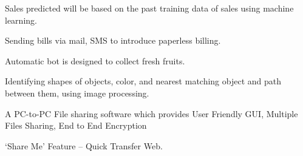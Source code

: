 \documentclass[]{hieudo-build}
\begin{document}
\begin{minipage}{0.6\textwidth}
\begin{tightemize}
\item  Sales predicted will be based on the past training data of sales using machine learning.
\item Sending bills via mail, SMS to introduce paperless billing.
\end{tightemize}
\vspace{1pt}

\begin{tightemize}
\item Automatic bot is designed to collect fresh fruits.
\item Identifying shapes of objects, color, and nearest matching object and path between them, using image processing.
\end{tightemize}


\begin{tightemize}
\item A PC-to-PC File sharing software which provides User Friendly GUI, Multiple Files Sharing, End to End Encryption
\item ‘Share Me’ Feature – Quick Transfer Web.
\end{tightemize}

\end{minipage}
\end{document}
